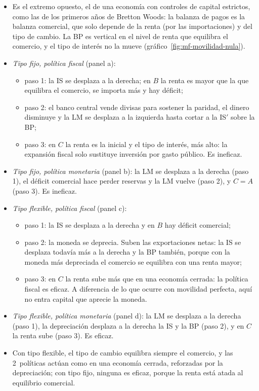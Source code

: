 \documentclass[11pt]{article}
\begin{document}
\begin{itemize}
\item Es el extremo opuesto, el de una economía con controles de capital estrictos, como las de los primeros años de Bretton Woods: la balanza de pagos es la balanza comercial, que solo depende de la renta (por las importaciones) y del tipo de cambio. La BP es vertical en el nivel de renta que equilibra el comercio, y el tipo de interés no la mueve (gráfico~\ref{fig:mf-movilidad-nula}).
\item \emph{Tipo fijo, política fiscal} (panel a):
  \begin{itemize}
  \item paso 1: la IS se desplaza a la derecha; en $B$ la renta es mayor que la que equilibra el comercio, se importa más y hay déficit;
  \item paso 2: el banco central vende divisas para sostener la paridad, el dinero disminuye y la LM se desplaza a la izquierda hasta cortar a la IS$'$ sobre la BP;
  \item paso 3: en $C$ la renta es la inicial y el tipo de interés, más alto: la expansión fiscal solo sustituye inversión por gasto público. Es ineficaz.
  \end{itemize}
\item \emph{Tipo fijo, política monetaria} (panel b): la LM se desplaza a la derecha (paso 1), el déficit comercial hace perder reservas y la LM vuelve (paso 2), y $C=A$ (paso 3). Es ineficaz.
\item \emph{Tipo flexible, política fiscal} (panel c):
  \begin{itemize}
  \item paso 1: la IS se desplaza a la derecha y en $B$ hay déficit comercial;
  \item paso 2: la moneda se deprecia. Suben las exportaciones netas: la IS se desplaza todavía más a la derecha y la BP también, porque con la moneda más depreciada el comercio se equilibra con una renta mayor;
  \item paso 3: en $C$ la renta sube más que en una economía cerrada: la política fiscal es eficaz. A diferencia de lo que ocurre con movilidad perfecta, aquí no entra capital que aprecie la moneda.
  \end{itemize}
\item \emph{Tipo flexible, política monetaria} (panel d): la LM se desplaza a la derecha (paso 1), la depreciación desplaza a la derecha la IS y la BP (paso 2), y en $C$ la renta sube (paso 3). Es eficaz.
\item Con tipo flexible, el tipo de cambio equilibra siempre el comercio, y las 2~políticas actúan como en una economía cerrada, reforzadas por la depreciación; con tipo fijo, ninguna es eficaz, porque la renta está atada al equilibrio comercial.
\end{itemize}
\end{document}
